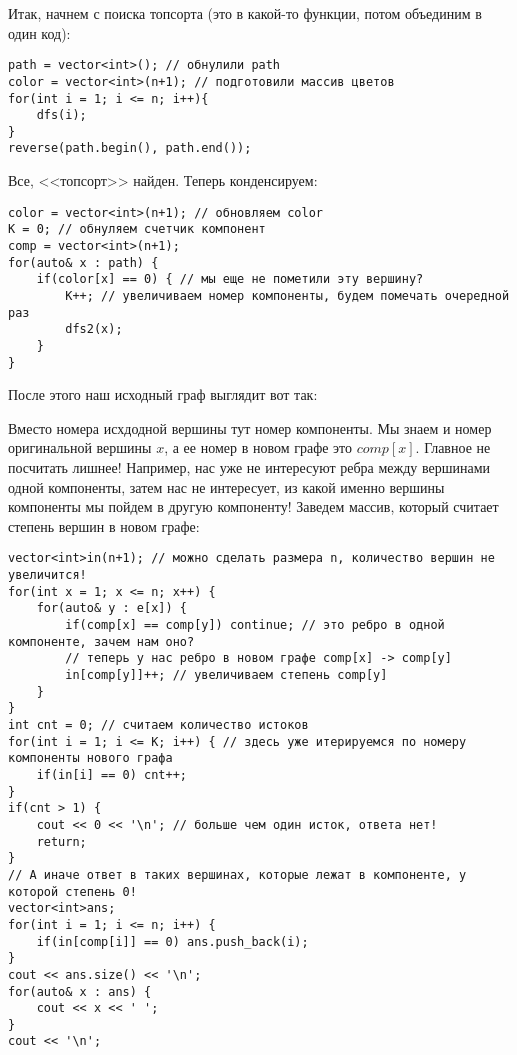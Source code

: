 \documentclass{article}
\begin{document}
Итак, начнем с поиска топсорта (это в какой-то функции, потом объединим в один код):
\begin{verbatim}
path = vector<int>(); // обнулили path
color = vector<int>(n+1); // подготовили массив цветов
for(int i = 1; i <= n; i++){
    dfs(i); 
}
reverse(path.begin(), path.end()); 
\end{verbatim}
Все, <<топсорт>> найден. Теперь конденсируем:
\begin{verbatim}
color = vector<int>(n+1); // обновляем color
K = 0; // обнуляем счетчик компонент
comp = vector<int>(n+1);
for(auto& x : path) {
    if(color[x] == 0) { // мы еще не пометили эту вершину?
        K++; // увеличиваем номер компоненты, будем помечать очередной раз
        dfs2(x);
    }
}
\end{verbatim}
После этого наш исходный граф выглядит вот так:
\begin{center}
    \end{center}
Вместо номера исхдодной вершины тут номер компоненты. Мы знаем и номер оригинальной вершины $x$, а ее номер в новом графе это $comp[x]$. Главное не посчитать лишнее! Например, нас уже не интересуют ребра между вершинами одной компоненты, затем нас не интересует, из какой именно вершины компоненты мы пойдем в другую компоненту!
Заведем массив, который считает степень вершин в новом графе:
\begin{verbatim}
vector<int>in(n+1); // можно сделать размера n, количество вершин не увеличится!
for(int x = 1; x <= n; x++) {
    for(auto& y : e[x]) {
        if(comp[x] == comp[y]) continue; // это ребро в одной компоненте, зачем нам оно?
        // теперь у нас ребро в новом графе comp[x] -> comp[y]
        in[comp[y]]++; // увеличиваем степень comp[y]
    }
}
int cnt = 0; // считаем количество истоков
for(int i = 1; i <= K; i++) { // здесь уже итерируемся по номеру компоненты нового графа
    if(in[i] == 0) cnt++;
}
if(cnt > 1) {
    cout << 0 << '\n'; // больше чем один исток, ответа нет!
    return; 
}
// А иначе ответ в таких вершинах, которые лежат в компоненте, у которой степень 0!
vector<int>ans;
for(int i = 1; i <= n; i++) {
    if(in[comp[i]] == 0) ans.push_back(i);
}
cout << ans.size() << '\n';
for(auto& x : ans) {
    cout << x << ' ';
}
cout << '\n';
\end{verbatim}
\end{document}
